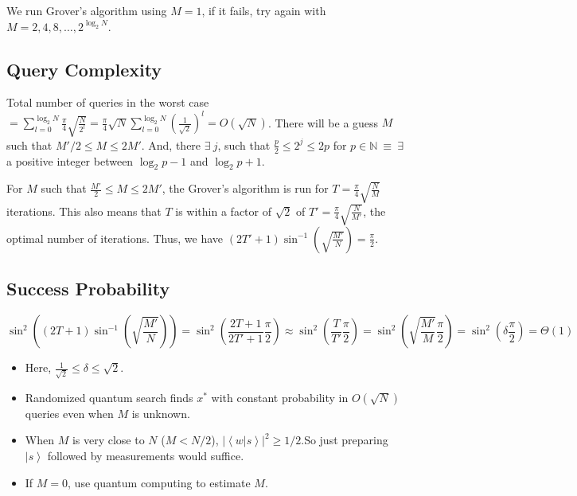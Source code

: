 \documentclass[11.5pt, paper=a4]{article}
\theoremstyle{definition}
\numberwithin{theorem}{section}
\newcommand{\ket}[1]{\ensuremath{\left|#1\right\rangle}}
\begin{document}
We run Grover's algorithm using $M = 1$, if it fails, try again with $M = 2, 4, 8, \ldots, 2^{\log_2 N}$.

\subsection{Query Complexity}
Total number of queries in the worst case $= \sum_{l = 0}^{\log_2 N} \frac{\pi}{4} \sqrt{\frac{N}{2^l}} = \frac{\pi}{4}\sqrt{N} \sum_{l = 0}^{\log_2 N} \left(\frac{1}{\sqrt 2}\right)^l = O(\sqrt N)$. There will be a guess $M$ such that $M'/2 \leq M \leq 2M'$. And, there $\exists\ j$, such that $\frac{p}{2} \leq 2^j \leq 2p$ for $p \in \mathbb{N}\ \equiv\ \exists$ a positive integer between $\log_2 p - 1$ and $\log_2 p + 1$. \newline

For $M$ such that $\frac{M'}{2} \leq M \leq 2M'$, the Grover's algorithm is run for $T = \frac{\pi}{4}\sqrt{\frac{N}{M}}$ iterations. This also means that $T$ is within a factor of $\sqrt{2}$ of $T' = \frac{\pi}{4}\sqrt{\frac{N}{M'}}$, the optimal number of iterations. Thus, we have $(2T' + 1) \sin^{-1}\left(\sqrt{\frac{M'}{N}}\right) = \frac{\pi}{2}$.

\subsection{Success Probability}
$$\sin^2\left((2T + 1) \sin^{-1} \left(\sqrt{\frac{M'}{N}}\right) \right) = \sin^2\left(\frac{2T + 1}{2T' + 1} \frac{\pi}{2}\right) \approx \sin^2 \left(\frac{T}{T'}\frac{\pi}{2}\right) = \sin^2 \left(\sqrt{\frac{M'}{M}}\frac{\pi}{2}\right) = \sin^2 \left(\delta \frac{\pi}{2}\right) = \Theta{(1)}$$

\begin{itemize}
    \item Here, $\frac{1}{\sqrt 2} \leq \delta \leq \sqrt 2$.\newline
    \item Randomized quantum search finds $x^*$ with constant probability in $O(\sqrt N)$ queries even when $M$ is unknown.
    \item When $M$ is very close to $N$ ($M < N / 2$), $|\left<w | s\right>|^2 \geq 1/2$.So just preparing $\ket{s}$ followed by measurements would suffice.
    \item If $M = 0$, use quantum computing to estimate $M$.
\end{itemize}

\nocite{*}


\end{document}

